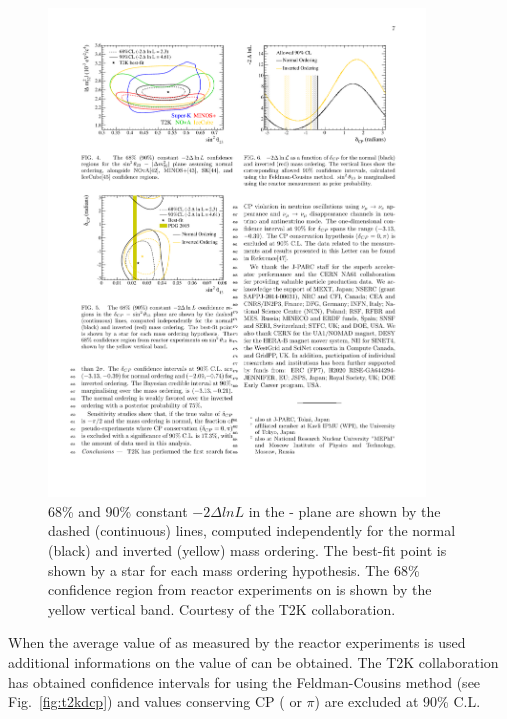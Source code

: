 \begin{figure} [htbp!]
\begin{center}
\includegraphics[width=10cm]{figures/t2k_joint_th13dcp.pdf}
\caption{\label{fig:t2kjoint} 68\% and 90\%  constant $-2\Delta ln L$ in the \dcp - \sto plane are shown by the dashed
(continuous) lines, computed independently for the normal
(black) and inverted (yellow) mass ordering. The best-fit point
is shown by a star for each mass ordering hypothesis. The
68\% confidence region from reactor experiments on \sto is
shown by the yellow vertical band. Courtesy of the T2K collaboration.}
\end{center}
\end{figure}


When the average value of \thint as measured by the reactor experiments is used additional informations on the value of \dcp can be obtained. The T2K collaboration has obtained confidence intervals for \dcp using the Feldman-Cousins method (see Fig.~\ref{fig:t2kdcp}) and values conserving CP ( or $\pi$) are excluded at 90\% C.L.

